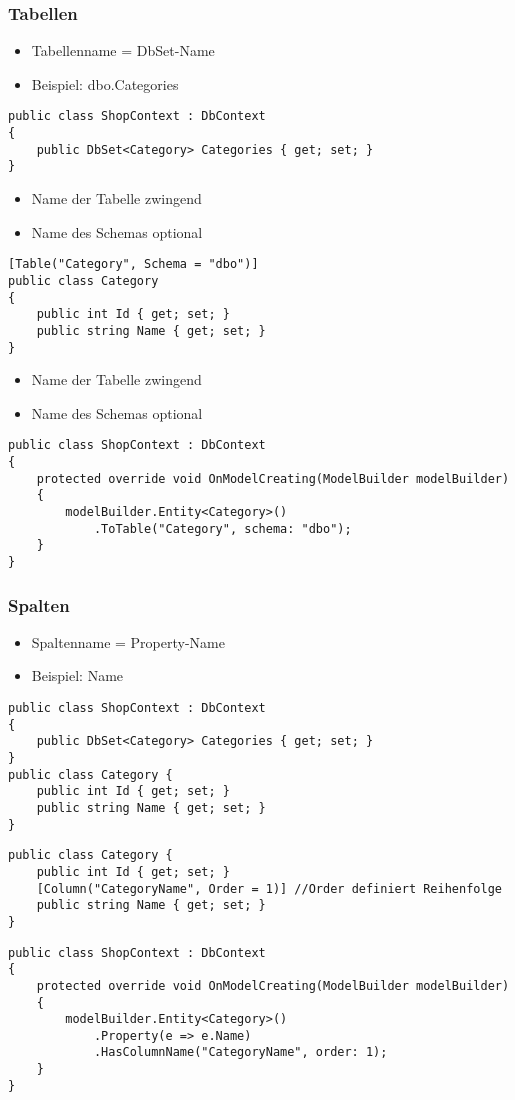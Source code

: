 \begin{multicols*}{2}
\subsubsection{Tabellen}
\begin{itemize}
    \item Tabellenname = DbSet-Name
    \item Beispiel: dbo.Categories
\end{itemize}
\begin{lstlisting}
public class ShopContext : DbContext 
{
    public DbSet<Category> Categories { get; set; }  
}
\end{lstlisting}
\begin{itemize}
    \item Name der Tabelle zwingend
    \item Name des Schemas optional
\end{itemize}
\begin{lstlisting}
[Table("Category", Schema = "dbo")] 
public class Category
{
    public int Id { get; set; }
    public string Name { get; set; }
}
\end{lstlisting}
\begin{itemize}
    \item Name der Tabelle zwingend
    \item Name des Schemas optional
\end{itemize}
\begin{lstlisting}
public class ShopContext : DbContext 
{
    protected override void OnModelCreating(ModelBuilder modelBuilder)
    {
        modelBuilder.Entity<Category>()
            .ToTable("Category", schema: "dbo");
    } 
}
\end{lstlisting}
\subsubsection{Spalten}
\begin{itemize}
    \item Spaltenname = Property-Name
    \item Beispiel: Name
\end{itemize}
\begin{lstlisting}
public class ShopContext : DbContext 
{
    public DbSet<Category> Categories { get; set; }  
}
public class Category {
    public int Id { get; set; } 
    public string Name { get; set; }
}
\end{lstlisting}
\begin{lstlisting}
public class Category {
    public int Id { get; set; } 
    [Column("CategoryName", Order = 1)] //Order definiert Reihenfolge
    public string Name { get; set; }
}
\end{lstlisting}
\begin{lstlisting}
public class ShopContext : DbContext 
{
    protected override void OnModelCreating(ModelBuilder modelBuilder)
    {
        modelBuilder.Entity<Category>()
            .Property(e => e.Name) 
            .HasColumnName("CategoryName", order: 1);
    } 
}
\end{lstlisting}

\end{multicols*}
